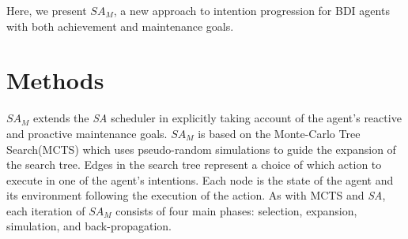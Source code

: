 \documentclass[a0, portrait]{a0poster}
\newcommand{\SA}{\emph{SA}\xspace}
\newcommand{\SAM}{\emph{$SA_M$}\xspace}
\begin{document}
\begin{multicols}{3}
Here, we present \SAM, a new approach to intention progression for BDI agents with both achievement and maintenance goals.

%


\color{DarkSlateGray} %




\section*{Methods}

\SAM extends the \SA scheduler \cite{Yao/Logan:16a} in explicitly taking account of the agent's reactive and proactive maintenance goals.
%
\SAM is based on the Monte-Carlo Tree Search(MCTS) which uses pseudo-random simulations to guide the expansion of the search tree.
Edges in the search tree represent a choice of which action to execute in one of the agent's intentions.
Each node is the state of the agent and its environment following the execution of the action.
%
As with MCTS and \SA, each iteration of \SAM consists of four main phases: selection, expansion, simulation, and back-propagation.


\end{multicols}
\end{document}
